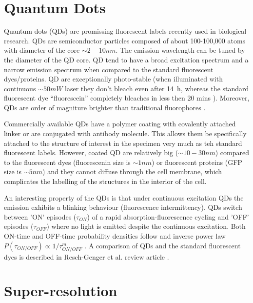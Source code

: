  \section{Quantum Dots}

Quantum dots (QDs) are promissing fluorescent labels recently used in biological research.  QDs are semiconductor particles composed of about 100-100,000 atoms with diameter of the core $\sim2-10\unit{nm}$. The emission wavelength can be tuned by the diameter of the QD core. QD tend to have a broad excitation spectrum and a narrow emission spectrum when compared to the standard fluorescent dyes/proteins. QD are exceptionally photo-stable (when illuminated with continuous $\sim 50\unit{mW}$ laser they don't bleach even after 14~h, whereas the standard fluorescent dye ``fluorescein'' completely bleaches in less then 20 mins \cite{Jaiswal2004}). Moreover, QDs are order of magniture brighter than traditional fluorophores \cite{Resch-Genger2008,Walling2009}. 

Commercially available QDs have a polymer coating with covalently attached linker or are conjugated with antibody molecule. This allows them be specifically attached to the structure of interest in the specimen very much as teh standard fluorescent labels. However, coated QD are relatively big ($\sim10-30\unit{nm}$) compared to the fluorescent dyes (fluorescenin size is $\sim1\unit{nm}$) or fluorescent proteins (GFP size is $\sim5\unit{nm}$) and they cannot diffuse through the cell membrane, which complicates the labelling of the structures in the interior of the cell. 

An interesting property of the QDs is that under continuous excitation QDs the emission exhibits a blinking behaviour (fluorescence intermittency). QDs switch between 'ON' episodes ($\tau_{ON}$) of a rapid absorption-fluorescence cycling and 'OFF' episodes ($\tau_{OFF}$) where no light is emitted despite the continuous excitation. Both ON-time and OFF-time probability densities follow and inverse power law $P(\tau_{ON/OFF})\propto1/\tau_{ON/OFF}^{m}$ \cite{kuno2001, Stefani2009}. A comparison of QDs and the standard fluorescent dyes is described in Resch-Genger et al. review article \cite{Resch-Genger2008}.

\section{Super-resolution\label{sec:super-resolution}}

